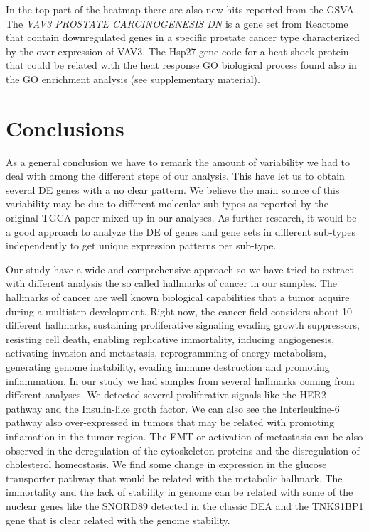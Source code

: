 \documentclass[9pt,twocolumn,twoside]{gsajnl}
\begin{document}
In the top part of the heatmap there are also new hits reported from the GSVA. The  \textit{VAV3 PROSTATE CARCINOGENESIS DN} \citep{liu2008targeted} is a gene set from Reactome that contain downregulated genes in a specific prostate cancer type characterized by the over-expression of VAV3. The Hsp27 gene code for a heat-shock protein that could be related with the heat response GO biological process found also in the GO enrichment analysis (see supplementary material).



\section*{Conclusions}

As a general conclusion we have to remark the amount of variability we had to deal with among the different steps of our analysis. This have let us to obtain several DE genes with a no clear pattern. We believe the main source of this variability may be due to different molecular sub-types as reported by the original TGCA paper \citep{Abeshouse2015} mixed up in our analyses.  As further research, it would be a good approach to analyze the DE of genes and gene sets in different sub-types independently to get unique expression patterns per sub-type.

Our study have a wide and comprehensive approach so we have tried to extract with different analysis the so called hallmarks of cancer in our samples. The hallmarks of cancer are well known biological capabilities that a tumor acquire during a multistep development. Right now, the cancer field considers about 10 different hallmarks, sustaining proliferative signaling
evading growth suppressors, resisting cell death, enabling replicative immortality, inducing angiogenesis, activating invasion and metastasis,
reprogramming of energy metabolism, generating genome instability,  evading immune destruction and promoting inflammation\citep{hanahan2011hallmarks}. In our study we had samples from several hallmarks coming from different analyses. We detected several proliferative signals like the HER2 pathway and the Insulin-like groth factor. We can also see the Interleukine-6 pathway also over-expressed in tumors that may be related with promoting inflamation in the tumor region. The EMT or activation of metastasis can be also observed in the deregulation of the cytoskeleton proteins and the disregulation of cholesterol homeostasis. We find some change in expression in the glucose transporter pathway that would be related with the metabolic hallmark. The immortality and the lack of stability in genome can be related with some of the nuclear genes like the SNORD89 detected in the classic DEA and the TNKS1BP1 gene that is clear related with the genome stability. 
\end{document}
